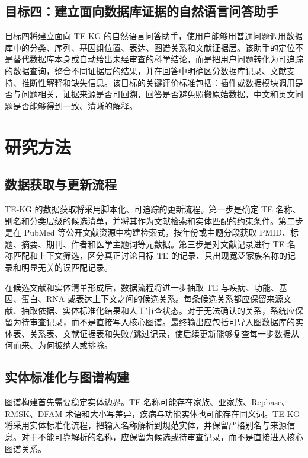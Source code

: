 \documentclass[12pt,a4paper,UTF8]{ctexart}
\begin{document}
\subsection{目标四：建立面向数据库证据的自然语言问答助手}

目标四将建立面向 TE-KG 的自然语言问答助手，使用户能够用普通问题调用数据库中的分类、序列、基因组位置、表达、图谱关系和文献证据层。该助手的定位不是替代数据库本身或自动给出未经审查的科学结论，而是把用户问题转化为可追踪的数据查询，整合不同证据层的结果，并在回答中明确区分数据库记录、文献支持、推断性解释和缺失信息。该目标的关键评价标准包括：插件或数据模块调用是否与问题相关，证据来源是否可回溯，回答是否避免照搬原始数据，中文和英文问题是否能够得到一致、清晰的解释。

\section{研究方法}

\subsection{数据获取与更新流程}

TE-KG 的数据获取将采用脚本化、可追踪的更新流程。第一步是确定 TE 名称、别名和分类层级的候选清单，并将其作为文献检索和实体匹配的约束条件。第二步是在 PubMed 等公开文献资源中构建检索式，按年份或主题分段获取 PMID、标题、摘要、期刊、作者和医学主题词等元数据。第三步是对文献记录进行 TE 名称匹配和上下文筛选，区分真正讨论目标 TE 的记录、只出现宽泛家族名称的记录和明显无关的误匹配记录。

在候选文献和实体清单形成后，数据流程将进一步抽取 TE 与疾病、功能、基因、蛋白、RNA 或表达上下文之间的候选关系。每条候选关系都应保留来源文献、抽取依据、实体标准化结果和人工审查状态。对于无法确认的关系，系统应保留为待审查记录，而不是直接写入核心图谱。最终输出应包括可导入图数据库的实体表、关系表、文献证据表和失败/跳过记录，使后续更新能够复查每一步数据从何而来、为何被纳入或排除。

\subsection{实体标准化与图谱构建}

图谱构建首先需要稳定实体边界。TE 名称可能存在家族、亚家族、Repbase、RMSK、DFAM 术语和大小写差异，疾病与功能实体也可能存在同义词。TE-KG 将采用实体标准化流程，把输入名称解析到规范实体，并保留严格别名与来源信息。对于不能可靠解析的名称，应保留为候选或待审查记录，而不是直接进入核心图谱关系。
\end{document}
